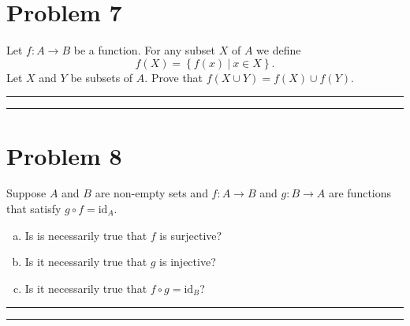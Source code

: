 \documentclass{article}
\theoremstyle{definition}
\newenvironment{solution}{\bigskip\hrule{\hfill}}{\bigskip\hrule{\hfill}} %
\begin{document}

\newpage


\section*{Problem 7}
Let $f:A\longrightarrow B$ be a function. For any subset $X$ of $A$ we define $$f\left(X\right)=\left\{f\left(x\right)~\big\vert~x\in X\right\}.$$ Let $X$ and $Y$ be subsets of $A$. Prove that $f\left(X\cup Y\right)=f\left(X\right)\cup f\left(Y\right)$.
\begin{solution}


\end{solution}


\newpage


\section*{Problem 8}
Suppose $A$ and $B$ are non-empty sets and $f:A\longrightarrow B$ and $g:B\longrightarrow A$ are functions that satisfy $g\circ f=\text{id}_A$.
\begin{enumerate}[a)] %
    \item Is is necessarily true that $f$ is surjective?
    \item Is it necessarily true that $g$ is injective?
    \item Is it necessarily true that $f\circ g=\text{id}_B$?
\end{enumerate}
\begin{solution}


\end{solution}
\end{document}
